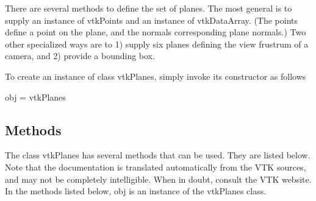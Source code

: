 There are several methods to define the set of planes. The most general is to supply an instance of vtk\-Points and an instance of vtk\-Data\-Array. (The points define a point on the plane, and the normals corresponding plane normals.) Two other specialized ways are to 1) supply six planes defining the view frustrum of a camera, and 2) provide a bounding box.

To create an instance of class vtk\-Planes, simply invoke its constructor as follows \begin{DoxyVerb}  obj = vtkPlanes
\end{DoxyVerb}
 \hypertarget{vtkwidgets_vtkxyplotwidget_Methods}{}\subsection{Methods}\label{vtkwidgets_vtkxyplotwidget_Methods}
The class vtk\-Planes has several methods that can be used. They are listed below. Note that the documentation is translated automatically from the V\-T\-K sources, and may not be completely intelligible. When in doubt, consult the V\-T\-K website. In the methods listed below, {\ttfamily obj} is an instance of the vtk\-Planes class. 
